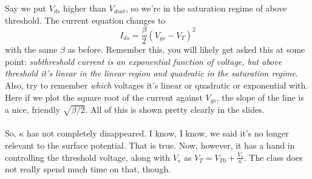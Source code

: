 \documentclass[main]{subfiles}
\begin{document}
Say we put $V_{ds}$ higher than $V_{dsat}$, so we're in the saturation regime of above threshold. The current equation changes to
\begin{equation}
I_{ds} = \frac{\beta}{2}(V_{gs} - V_T)^2
\label{abvSatEqn}
\end{equation}
with the same $\beta$ as before. Remember this, you will likely get asked this at some point: \textsl{subthreshold current is an exponential function of voltage, but above threshold it's linear in the linear region and \emph{quadratic} in the saturation regime}. Also, try to remember \emph{which} voltages it's linear or quadratic or exponential with. Here if we plot the square root of the current against $V_{gs}$, the slope of the line is a nice, friendly $\sqrt{\beta/2}$. All of this is shown pretty clearly in the slides.\\ \\
So, $\kappa$ has not completely disappeared. I know, I know, we said it's no longer relevant to the surface potential. That is true. Now, however, it has a hand in controlling the threshold voltage, along with $V_s$ as $V_T = V_{T0} + \frac{V_s}{\kappa}$. The class does not really spend much time on that, though.\\ \\
\end{document}

